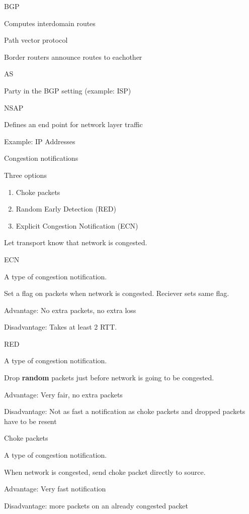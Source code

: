 \documentclass[main.tex]{subfiles}
\begin{document}
\begin{card}{BGP}
\item Computes interdomain routes
\item Path vector protocol
\item Border routers announce routes to eachother
\end{card}

\begin{card}{AS}
\item Party in the BGP setting (example: ISP)
\end{card}

\begin{card}{NSAP}
\item Defines an end point for network layer traffic
\item Example: IP Addresses
\end{card}

\begin{card}{Congestion notifications}
\item Three options
    \begin{enumerate}
        \item Choke packets
        \item Random Early Detection (RED)
        \item Explicit Congestion Notification (ECN)
    \end{enumerate}
\item Let transport know that network is congested.
\end{card}

\begin{card}{ECN}
\item A type of congestion notification.
\item Set a flag on packets when network is congested. Reciever sets same flag.
\item Advantage: No extra packets, no extra loss
\item Disadvantage: Takes at least 2 RTT.
\end{card}

\begin{card}{RED}
\item A type of congestion notification.
\item Drop \textbf{random} packets just before network is going to be congested.
\item Advantage: Very fair, no extra packets
\item Disadvantage: Not as fast a notification as choke packets and dropped packets have to be resent
\end{card}

\begin{card}{Choke packets}
\item A type of congestion notification.
\item When network is congested, send choke packet directly to source.
\item Advantage: Very fast notification
\item Disadvantage: more packets on an already congested packet
\end{card}
\end{document}
